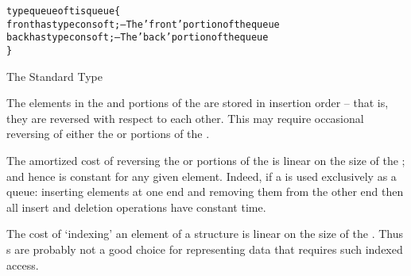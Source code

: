 \begin{program}
\begin{alltt}
type queue of t is queue\{
  front has type cons of t; -- The 'front' portion of the queue
  back has type cons of t;  -- The 'back' portion of the queue
\}
\end{alltt}
\caption{The Standard  Type}\label{queueTypeProg}
\end{program}
\begin{aside}
The elements in the  and  portions of the  are stored in insertion order -- that is, they are reversed with respect to each other. This may require occasional reversing of either the  or  portions of the .
\end{aside}

\begin{aside}
The amortized cost of reversing the   or  portions of the  is linear on the size of the ; and hence is constant for any given element. Indeed, if a  is used exclusively as a queue: inserting elements at one end and removing them from the other end then all insert and deletion operations have constant time.
\end{aside}

\begin{aside}
The cost of `indexing' an element of a  structure is linear on the size of the . Thus s are probably not a good choice for representing data that requires such indexed access.
\end{aside}
